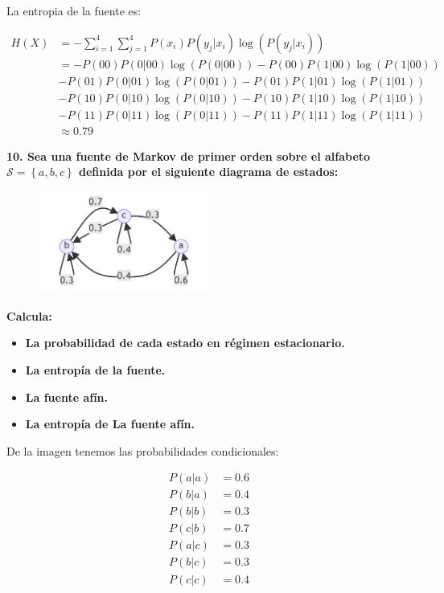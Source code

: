 \documentclass{article}
\begin{document}
La entropia de la fuente es:

\begin{align*}
    H(X) &= -\sum_{i=1}^{4}\sum_{j=1}^{4}P(x_i)P(y_j|x_i)\log\left(P(y_j|x_i)\right)\\
    &= -P(00)P(0|00)\log\left(P(0|00)\right) - P(00)P(1|00)\log\left(P(1|00)\right)\\
    &- P(01)P(0|01)\log\left(P(0|01)\right) - P(01)P(1|01)\log\left(P(1|01)\right)\\
    &- P(10)P(0|10)\log\left(P(0|10)\right) - P(10)P(1|10)\log\left(P(1|10)\right)\\
    &- P(11)P(0|11)\log\left(P(0|11)\right) - P(11)P(1|11)\log\left(P(1|11)\right)\\
    &\approx 0.79
\end{align*}

\pagebreak

\textbf{
10. Sea una fuente de Markov de primer orden sobre el alfabeto $\mathcal{S}=\left\{a,b,c\right\}$ definida por el siguiente diagrama de estados:
}

\begin{figure}[htbp!]
    \centering
    \includegraphics[width=0.5\textwidth]{./entropia_y_fuentes/img/mermaid2.png}
\end{figure}

\textbf{Calcula:}

\begin{itemize}
    \item\textbf{La probabilidad de cada estado en régimen estacionario.}
    \item\textbf{La entropía de la fuente.}
    \item\textbf{La fuente afín.}
    \item\textbf{La entropía de La fuente afín.}
\end{itemize}

\vspace{0.5cm}

De la imagen tenemos las probabilidades condicionales:

\begin{align*}
    P(a|a) &= 0.6\\
    P(b|a) &= 0.4\\
    P(b|b) &= 0.3\\
    P(c|b) &= 0.7\\
    P(a|c) &= 0.3\\
    P(b|c) &= 0.3\\
    P(c|c) &= 0.4
\end{align*}
\end{document}
